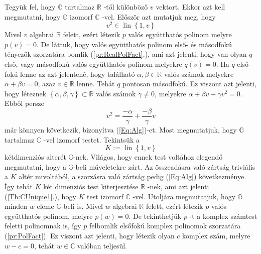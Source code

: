 \documentclass[9pt, a4paper, showtrims]{memoir}
\makeatletter
\renewenvironment{proof}[1][\proofname]
    {\par\pushQED{\qed}%
    \normalfont \topsep6\p@\@plus6\p@\relax
    \trivlist
    \item[\hskip\labelsep
        \itshape
    #1\@addpunct{:}]\ignorespaces}
    {\popQED\endtrivlist\@endpefalse}
\theoremstyle{plain}
\theoremstyle{remark}
\theoremstyle{definition}
\DeclareMathOperator{\lin}{lin}
\makeatother
\begin{document}
\begin{proof}
    Tegyük fel, hogy $\mathbb{G}$ tartalmaz $\mathbb{R}$ -től különböző $v$ vektort.
    Ekkor azt kell megmutatni, hogy $\mathbb{G}$ izomorf $\mathbb{C}$ -vel.\newline
    Először azt mutatjuk meg, hogy 
    \begin{equation}
        v^{2}\in \lin\left\{ 1,v\right\} 
    \end{equation}
    \label{Eq:Alg}Mivel $v$ algebrai $\mathbb{R}$ felett, ezért létezik $p$
    valós együtthatós polinom melyre $p\left( v\right) =0$.
    De láttuk, hogy valós együtthatós polinom első- és másodfokú tényezők szorzatára bomlik (\ref{pr:RealPolFact}.),
    ami azt jelenti, hogy van olyan $q$ első, vagy másodfokú valós együtthatós polinom melyekre $q\left( v\right) =0$.
    Ha $q$ első
    fokú lenne az azt jelentené, hogy található $\alpha ,\beta
    \in \mathbb{R}$ valós számok melyekre $\alpha +\beta v=0$, azaz $v\in \mathbb{R}$ lenne.
    Tehát $q$ pontosan másodfokú.
    Ez viszont azt
    jelenti, hogy léteznek $\left\{ \alpha ,\beta ,\gamma \right\} \subset 
    \mathbb{R}$ valós számok $\gamma \neq 0$, melyekre $\alpha +\beta
    v+\gamma v^{2}=0$.
    Ebből persze 
    \[
        v^{2}=\frac{-\alpha }{\gamma }+\frac{-\beta }{\gamma }v
    \]
    már könnyen következik, bizonyítva (\ref{Eq:Alg})-et.\newline
    Most megmutatjuk, hogy $\mathbb{G}$ tartalmaz $\mathbb{C}$ -vel izomorf testet.
    Tekintsük a 
    \[
        K:=\lin\left\{ 1,v\right\} 
    \]
    kétdimenziós alterét $\mathbb{G}$-nek.
    Világos, hogy ennek test
    voltához elegendő megmutatni, hogy a $\mathbb{G}$-beli műveletekre zárt.
    Az összeadásra való zártság triviális a $K$
    altér mivoltából, a szorzásra való zártság pedig
    (\ref{Eq:Alg}) következménye.
    \'{I}gy tehát $K$ két dimenziós test kiterjesztése $\mathbb{R}$ -nek, ami azt jelenti (\ref{Th:CUnique1}.), 
    hogy $K$ test izomorf $\mathbb{C}$ -vel.\newline
    Utoljára megmutatjuk, hogy $\mathbb{G}$ minden $w$ eleme $\mathbb{C}$-beli
    is.
    Mivel $w$ algebrai $\mathbb{R}$ felett, ezért létezik $p$ valós együtthatós polinom, melyre $p\left( w\right) =0$.
    De tekinthetjük $p$ -t a komplex számtest feletti polinomnak is, így $p$
    felbomlik elsőfokú komplex polinomok szorzatára (\ref{pr:PolFact}).
    Ez viszont azt jelenti, hogy létezik olyan $c$ komplex szám,
    melyre $w-c=0$, tehát $w\in \mathbb{C}$ valóban teljesül.
\end{proof}


\backmatter
\pagestyle{empty}
%
\printbibliography
\printindex
\end{document}
